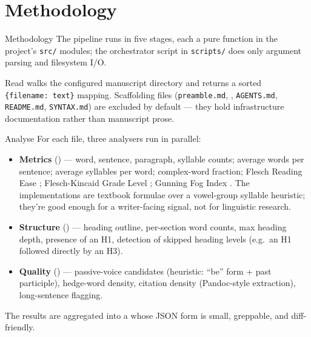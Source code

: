 \documentclass[
  ignorenonframetext,
]{beamer}
\author{\texorpdfstring{}{}}
\date{}
\begin{document}
\section{Methodology}\label{sec:methodology}

\begin{frame}{Methodology}
The pipeline runs in five stages, each a pure function in the project's
\texttt{src/} modules; the orchestrator script in \texttt{scripts/} does
only argument parsing and filesystem I/O.
\end{frame}

\begin{frame}{Read}
\protect{}\label{read}
 walks the configured
manuscript directory and returns a sorted \texttt{\{filename:\ text\}}
mapping. Scaffolding files (\texttt{preamble.md},
, \texttt{AGENTS.md}, \texttt{README.md},
\texttt{SYNTAX.md}) are excluded by default --- they hold infrastructure
documentation rather than manuscript prose.
\end{frame}

\begin{frame}{Analyse}
\protect{}\label{analyse}
For each file, three analysers run in parallel:

\begin{itemize}
\item
  \textbf{Metrics} () ---
  word, sentence, paragraph, syllable counts; average words per
  sentence; average syllables per word; complex-word fraction; Flesch
  Reading Ease ; Flesch-Kincaid Grade Level
  ; Gunning Fog Index
  . The implementations are textbook formulae
  over a vowel-group syllable heuristic; they're good enough for a
  writer-facing signal, not for linguistic research.
\item
  \textbf{Structure} ()
  --- heading outline, per-section word counts, max heading depth,
  presence of an H1, detection of skipped heading levels (e.g.~an H1
  followed directly by an H3).
\item
  \textbf{Quality} () ---
  passive-voice candidates (heuristic: ``be'' form + past participle),
  hedge-word density, citation density (Pandoc-style \texttt{\breakseq{[@key]}}
  extraction), long-sentence flagging.
\end{itemize}

The results are aggregated into a  whose JSON
form is small, greppable, and diff-friendly.
\end{frame}
\end{document}
